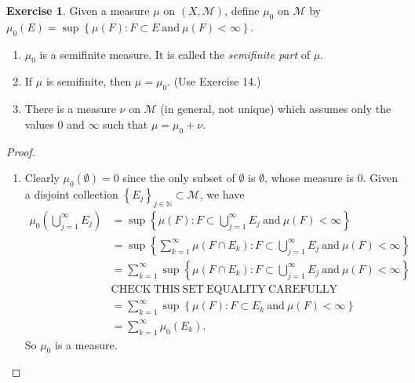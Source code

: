 \documentclass{article}
\theoremstyle{definition}
\newtheorem{ex}{Exercise}
\begin{document}
\begin{ex}
	Given a measure $\mu$ on $(X, \mathscr{M})$, define $\mu_0$ on $\mathscr{M}$ by $\mu_0(E) = \sup \left\lbrace \mu(F) : F \subset E\ \mathrm{and}\ \mu(F) < \infty \right\rbrace$.
	\begin{enumerate}[label=\textbf{\alph*.}]
		\item $\mu_0$ is a semifinite measure. It is called the \textit{semifinite part} of $\mu$.
		\item If $\mu$ is semifinite, then $\mu = \mu_0$. (Use Exercise 14.)
		\item There is a measure $\nu$ on $\mathscr{M}$ (in general, not unique) which assumes only the values $0$ and $\infty$ such that $\mu = \mu_0 + \nu$.
	\end{enumerate}
\end{ex}
\begin{proof}\
	\begin{enumerate}[label=\textbf{\alph*.}]
		\item Clearly $\mu_0(\emptyset) = 0$ since the only subset of $\emptyset$ is $\emptyset$, whose measure is $0$.
		      Given a disjoint collection $\left\lbrace E_j \right\rbrace_{j \in \mathbb{N}} \subset \mathscr{M}$, we have \begin{align*}
			      \mu_0 \left( \bigcup _{j = 1}^{\infty} E_j \right) & = \sup \left\lbrace \mu(F) : F \subset \bigcup _{j = 1}^{\infty} E_j\ \mathrm{and}\ \mu(F) < \infty \right\rbrace                           \\
			                                                         & = \sup \left\lbrace \sum_{k = 1}^\infty \mu(F \cap E_k) : F \subset \bigcup_{j = 1}^\infty E_j\ \mathrm{and}\ \mu(F) < \infty \right\rbrace \\
			                                                         & = \sum_{k = 1}^\infty \sup \left\lbrace \mu(F \cap E_k) : F \subset \bigcup_{j = 1}^\infty E_j\ \mathrm{and}\ \mu(F) < \infty \right\rbrace \\
			                                                         & \mathrm{CHECK\ THIS\ SET\ EQUALITY\ CAREFULLY}                                                                                              \\
			                                                         & = \sum _{k = 1}^{\infty} \sup \left\lbrace \mu(F) : F \subset E_k\ \mathrm{and}\ \mu(F) < \infty \right\rbrace                              \\
			                                                         & = \sum _{k = 1}^{\infty} \mu_0(E_k).
		      \end{align*}
		      So $\mu_0$ is a measure.


\end{enumerate}
\end{proof}
\end{document}
